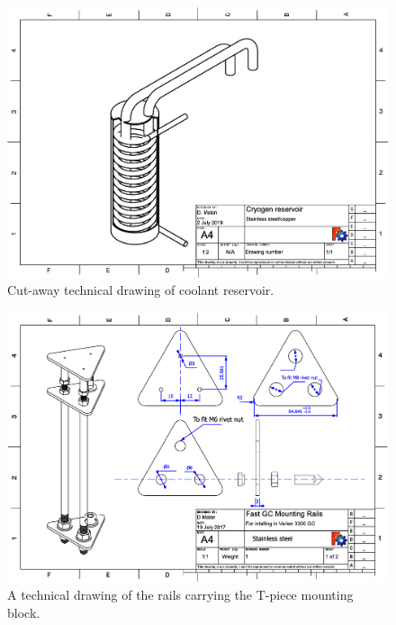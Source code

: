\begin{figure}
	\centering
	\includegraphics[angle=90, origin=c, scale=0.75]{Figures/CryogenReservoir.pdf}
	\decoRule
	\caption[Coolant reservoir]{Cut-away technical drawing of coolant reservoir.}	
	\label{fig:CryogenReservoir}
\end{figure}

\begin{figure}
	\centering
	\includegraphics[angle=90, origin=c, scale=0.75]{Figures/RailsDrawing.pdf}
	\decoRule	
	
	\caption[Technical drawing of coaxial heater mounting
	rails]{\label{fig:RailsDrawing}A technical drawing of the rails carrying the
	T-piece mounting block.}
	
\end{figure}

